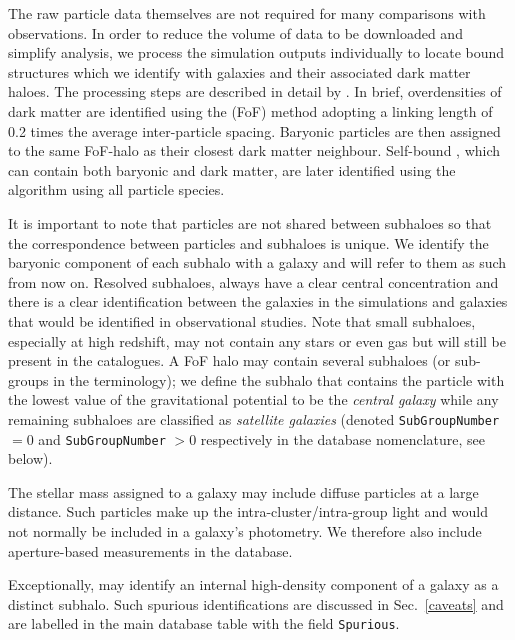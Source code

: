 The raw particle data themselves are not required for many comparisons with
observations. In order to reduce the volume of data to be downloaded and
simplify analysis, we process the simulation outputs individually to locate bound
structures which we identify with galaxies and their associated dark matter
haloes. The processing steps are described in detail by \cite{Schaye2015}. In
brief, overdensities of dark matter are identified using the
 (FoF) method \citep{Davis1985} adopting a linking
length of 0.2 times the average inter-particle spacing. Baryonic particles are
then assigned to the same FoF-halo as their closest dark matter
neighbour. Self-bound , which can contain both baryonic and
dark matter, are later identified using the \subfind algorithm
\citep{Springel2001,Dolag2009} using all particle species.

It is important to note that particles are not shared between subhaloes so that
the correspondence between particles and subhaloes is unique. We identify the
baryonic component of each subhalo with a galaxy and will refer to them as such
from now on. Resolved subhaloes, always have a clear central concentration and
there is a clear identification between the galaxies in the simulations and
galaxies that would be identified in observational studies. Note that small
subhaloes, especially at high redshift, may not contain any stars or even gas
but will still be present in the catalogues. A FoF halo may contain several
subhaloes (or sub-groups in the \subfind terminology); we define the subhalo
that contains the particle with the lowest value of the gravitational potential
to be the \emph{central galaxy} while any remaining subhaloes are classified as
\emph{satellite galaxies} (denoted \texttt{SubGroupNumber} $= 0$ and
\texttt{SubGroupNumber} $> 0$ respectively in the database nomenclature, see
below).

The stellar mass assigned to a galaxy may include diffuse particles at a large
distance. Such particles make up the intra-cluster/intra-group light and would
not normally be included in a galaxy's photometry. We therefore also include
aperture-based measurements in the database. 

Exceptionally, \subfind may identify an internal high-density component of a
galaxy as a distinct subhalo. Such spurious identifications are discussed in
Sec.~\ref{caveats} and are labelled in the main database table with the field
{\tt Spurious}.


